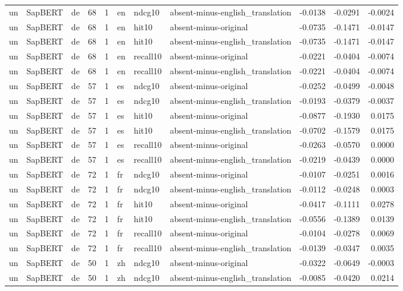 \begin{tabular}{lllrrlllrrr}
un & SapBERT & de & 68 & 1 & en & ndcg10 & absent-minus-english\_translation & -0.0138 & -0.0291 & -0.0024 \\
un & SapBERT & de & 68 & 1 & en & hit10 & absent-minus-original & -0.0735 & -0.1471 & -0.0147 \\
un & SapBERT & de & 68 & 1 & en & hit10 & absent-minus-english\_translation & -0.0735 & -0.1471 & -0.0147 \\
un & SapBERT & de & 68 & 1 & en & recall10 & absent-minus-original & -0.0221 & -0.0404 & -0.0074 \\
un & SapBERT & de & 68 & 1 & en & recall10 & absent-minus-english\_translation & -0.0221 & -0.0404 & -0.0074 \\
un & SapBERT & de & 57 & 1 & es & ndcg10 & absent-minus-original & -0.0252 & -0.0499 & -0.0048 \\
un & SapBERT & de & 57 & 1 & es & ndcg10 & absent-minus-english\_translation & -0.0193 & -0.0379 & -0.0037 \\
un & SapBERT & de & 57 & 1 & es & hit10 & absent-minus-original & -0.0877 & -0.1930 & 0.0175 \\
un & SapBERT & de & 57 & 1 & es & hit10 & absent-minus-english\_translation & -0.0702 & -0.1579 & 0.0175 \\
un & SapBERT & de & 57 & 1 & es & recall10 & absent-minus-original & -0.0263 & -0.0570 & 0.0000 \\
un & SapBERT & de & 57 & 1 & es & recall10 & absent-minus-english\_translation & -0.0219 & -0.0439 & 0.0000 \\
un & SapBERT & de & 72 & 1 & fr & ndcg10 & absent-minus-original & -0.0107 & -0.0251 & 0.0016 \\
un & SapBERT & de & 72 & 1 & fr & ndcg10 & absent-minus-english\_translation & -0.0112 & -0.0248 & 0.0003 \\
un & SapBERT & de & 72 & 1 & fr & hit10 & absent-minus-original & -0.0417 & -0.1111 & 0.0278 \\
un & SapBERT & de & 72 & 1 & fr & hit10 & absent-minus-english\_translation & -0.0556 & -0.1389 & 0.0139 \\
un & SapBERT & de & 72 & 1 & fr & recall10 & absent-minus-original & -0.0104 & -0.0278 & 0.0069 \\
un & SapBERT & de & 72 & 1 & fr & recall10 & absent-minus-english\_translation & -0.0139 & -0.0347 & 0.0035 \\
un & SapBERT & de & 50 & 1 & zh & ndcg10 & absent-minus-original & -0.0322 & -0.0649 & -0.0003 \\
un & SapBERT & de & 50 & 1 & zh & ndcg10 & absent-minus-english\_translation & -0.0085 & -0.0420 & 0.0214 \\

\end{tabular}
